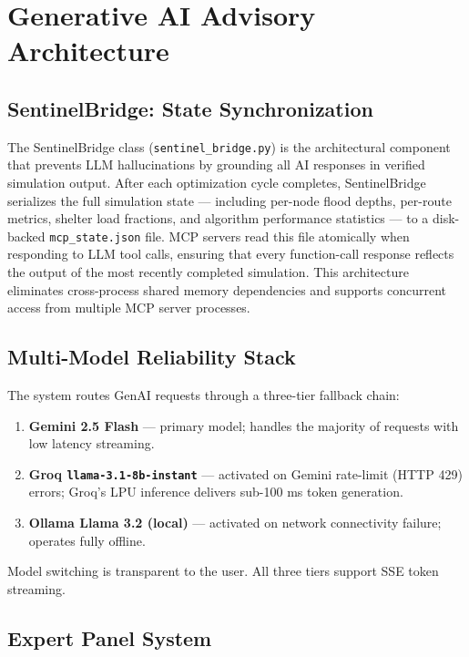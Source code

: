 \documentclass[journal]{IEEEtran}
\begin{document}
\section{Generative AI Advisory Architecture}
\label{sec:genai}

\subsection{SentinelBridge: State Synchronization}

The SentinelBridge class (\texttt{sentinel\_bridge.py}) is the architectural component that
prevents LLM hallucinations by grounding all AI responses in verified simulation output.
After each optimization cycle completes, SentinelBridge serializes the full simulation
state — including per-node flood depths, per-route metrics, shelter load fractions, and
algorithm performance statistics — to a disk-backed \texttt{mcp\_state.json} file. MCP
servers read this file atomically when responding to LLM tool calls, ensuring that every
function-call response reflects the output of the most recently completed simulation. This
architecture eliminates cross-process shared memory dependencies and supports concurrent
access from multiple MCP server processes.

\subsection{Multi-Model Reliability Stack}

The system routes GenAI requests through a three-tier fallback chain:
\begin{enumerate}
  \item \textbf{Gemini 2.5 Flash} \cite{gemini2023} — primary model; handles the majority
  of requests with low latency streaming.
  \item \textbf{Groq \texttt{llama-3.1-8b-instant}} — activated on Gemini rate-limit
  (HTTP 429) errors; Groq's LPU inference delivers sub-100 ms token generation.
  \item \textbf{Ollama Llama 3.2 (local)} — activated on network connectivity failure;
  operates fully offline.
\end{enumerate}
Model switching is transparent to the user. All three tiers support SSE token streaming.

\subsection{Expert Panel System}
\end{document}

